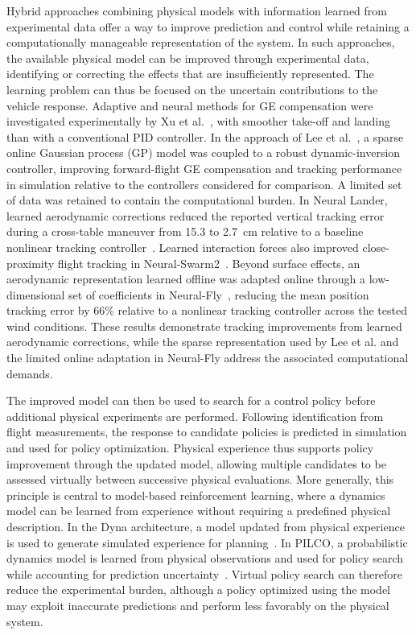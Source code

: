 \documentclass[journal]{IEEEtran}
\begin{document}
Hybrid approaches combining physical models with information learned from experimental data offer a way to improve prediction and control while retaining a computationally manageable representation of the system. 
In such approaches, the available physical model can be improved through experimental data, identifying or correcting the effects that are insufficiently represented. The learning problem can thus be focused on the uncertain contributions to the vehicle response. Adaptive and neural methods for GE compensation were investigated experimentally by Xu et al.~\cite{XuGE2022}, with smoother take-off and landing than with a conventional PID controller. In the approach of Lee et al.~\cite{LeeSparseGE2025}, a sparse online Gaussian process (GP) model was coupled to a robust dynamic-inversion controller, improving forward-flight GE compensation and tracking performance in simulation relative to the controllers considered for comparison. A limited set of data was retained to contain the computational burden. In Neural Lander, learned aerodynamic corrections reduced the reported vertical tracking error during a cross-table maneuver from 15.3 to 2.7~cm relative to a baseline nonlinear tracking controller~\cite{NeuralLander2019}. Learned interaction forces also improved close-proximity flight tracking in Neural-Swarm2~\cite{NeuralSwarm2022}. Beyond surface effects, an aerodynamic representation learned offline was adapted online through a low-dimensional set of coefficients in Neural-Fly~\cite{NeuralFly2022}, reducing the mean position tracking error by 66\% relative to a nonlinear tracking controller across the tested wind conditions. These results demonstrate tracking improvements from learned aerodynamic corrections, while the sparse representation used by Lee et al. and the limited online adaptation in Neural-Fly address the associated computational demands.

The improved model can then be used to search for a control policy before additional physical experiments are performed. Following identification from flight measurements, the response to candidate policies is predicted in simulation and used for policy optimization. Physical experience thus supports policy improvement through the updated model, allowing multiple candidates to be assessed virtually between successive physical evaluations. More generally, this principle is central to model-based reinforcement learning, where a dynamics model can be learned from experience without requiring a predefined physical description. In the Dyna architecture, a model updated from physical experience is used to generate simulated experience for planning~\cite{Sutton1991}. In PILCO, a probabilistic dynamics model is learned from physical observations and used for policy search while accounting for prediction uncertainty~\cite{Deisenroth2011}. Virtual policy search can therefore reduce the experimental burden, although a policy optimized using the model may exploit inaccurate predictions and perform less favorably on the physical system.
 
\end{document}
